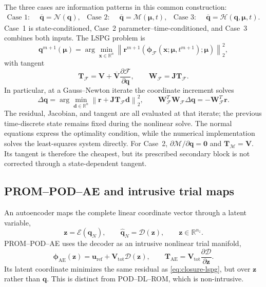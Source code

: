 \documentclass[11pt]{article}
\newcommand{\q}{\mathbf q}
\newcommand{\qbar}{\overline{\mathbf q}}
\newcommand{\qp}{\q}
\newcommand{\qs}{\qbar}
\newcommand{\uvec}{\mathbf u}
\newcommand{\mub}{\bm\mu}
\newcommand{\z}{\mathbf z}
\newcommand{\norm}[1]{\left\lVert #1 \right\rVert}
\begin{document}
The three cases are information patterns in this common construction:
\begin{align}
\text{Case 1:}\quad&\qs=\mathcal N(\qp),&
\text{Case 2:}\quad&\qs=\mathcal M(\mub,t),&
\text{Case 3:}\quad&\qs=\mathcal H(\qp,\mub,t).
\label{eq:closure-cases}
\end{align}
Case~1 is state-conditioned, Case~2 parameter--time-conditioned, and Case~3
combines both inputs.  The LSPG problem is
\begin{equation}
\qp^{m+1}(\mub)=\arg\min_{\mathbf x\in\mathbb R^n}
\norm{\mathbf r^{m+1}(\boldsymbol\phi_{\mathcal F}
(\mathbf x;\mub,t^{m+1});\mub)}_2^2,
\label{eq:closure-lspg}
\end{equation}
with tangent
\begin{equation}
\mathbf T_{\mathcal F}=\mathbf V+\overline{\mathbf V}
\frac{\partial\mathcal F}{\partial\qp},\qquad
\mathbf W_{\mathcal F}=\mathbf J\mathbf T_{\mathcal F}.
\label{eq:closure-tangent}
\end{equation}
In particular, at a Gauss--Newton iterate the coordinate increment solves
\begin{equation}
\Delta\q=\arg\min_{\mathbf d\in\mathbb R^n}
\norm{\mathbf r+\mathbf J\mathbf T_{\mathcal F}\mathbf d}_2^2,
\qquad
\mathbf W_{\mathcal F}^T\mathbf W_{\mathcal F}\Delta\q
=-\mathbf W_{\mathcal F}^T\mathbf r.
\label{eq:closure-gn}
\end{equation}
The residual, Jacobian, and tangent are all evaluated at that iterate;
the previous time-discrete state remains fixed during the nonlinear solve.
The normal equations express the optimality condition, while the numerical
implementation solves the least-squares system directly.
For Case~2, $\partial\mathcal M/\partial\qp=\mathbf0$ and
$\mathbf T_{\mathcal M}=\mathbf V$.  Its tangent is therefore the cheapest,
but its prescribed secondary block is not corrected through a
state-dependent tangent.

\subsection{PROM--POD--AE and intrusive trial maps}
An autoencoder maps the complete linear coordinate vector through a latent
variable,
\begin{equation}
\z=\mathcal E(\q_N),\qquad
\widehat{\q}_N=\mathcal D(\z),\qquad \z\in\mathbb R^{n_z}.
\end{equation}
PROM--POD--AE uses the decoder as an intrusive nonlinear trial manifold,
\begin{equation}
\boldsymbol\phi_{\mathrm{AE}}(\z)=\uvec_{\mathrm{ref}}+
\mathbf V_{\mathrm{tot}}\mathcal D(\z),\qquad
\mathbf T_{\mathrm{AE}}=\mathbf V_{\mathrm{tot}}
\frac{\partial\mathcal D}{\partial\z}.
\label{eq:podae-manifold}
\end{equation}
Its latent coordinate minimizes the same residual as
\eqref{eq:closure-lspg}, but over $\z$ rather than $\qp$.  This is distinct
from POD--DL--ROM, which is non-intrusive.
\end{document}
